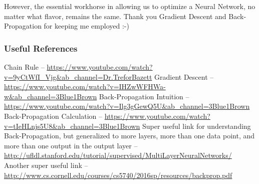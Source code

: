 \documentclass[
]{article}
\begin{document}
However, the essential workhorse in allowing us to optimize a Neural
Network, no matter what flavor, remains the same. Thank you Gradient
Descent and Back-Propagation for keeping me employed :-)

\hypertarget{useful-references}{%
\subsubsection{Useful References}\label{useful-references}}

Chain Rule --
\url{https://www.youtube.com/watch?v=9yCtWfI_Vjg\&ab_channel=Dr.TreforBazett}
Gradient Descent --
\url{https://www.youtube.com/watch?v=IHZwWFHWa-w\&ab_channel=3Blue1Brown}
Back-Propagation Intuition --
\url{https://www.youtube.com/watch?v=Ilg3gGewQ5U\&ab_channel=3Blue1Brown}
Back-Propagation Calculation --
\url{https://www.youtube.com/watch?v=tIeHLnjs5U8\&ab_channel=3Blue1Brown}
Super useful link for understanding Back-Propagation, but generalized to
more layers, more than one data point, and more than one output in the
output layer --
\url{http://ufldl.stanford.edu/tutorial/supervised/MultiLayerNeuralNetworks/}
Another super useful link --
\url{http://www.cs.cornell.edu/courses/cs5740/2016sp/resources/backprop.pdf}
\end{document}
